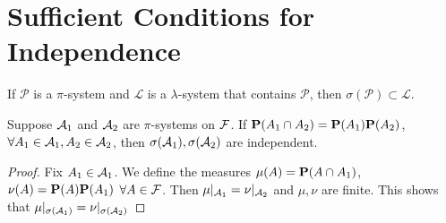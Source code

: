 \section{Sufficient Conditions for Independence}
\begin{theorem}
If $\mathcal{P}$ is a $\pi$-system and $\mathcal{L}$ is a $\lambda$-system that contains $\mathcal{P}$, then $\sigma(\mathcal{P})\subset \mathcal{L}$.
\end{theorem}

\begin{theorem}
    Suppose $\mathcal{A}_1$ and $\mathcal{A}_2$ are $\pi$-systems on $\mathcal{F}$. If $\mathbf{P}(A_1\cap A_2)=\mathbf{P}(A_1)\mathbf{P}(A_2)$, $\forall A_1\in\mathcal{A}_1,A_2\in\mathcal{A}_2$,
    then $\sigma(\mathcal{A}_1),\sigma(\mathcal{A}_2)$ are independent.
\end{theorem}
\begin{proof}
    Fix $A_1\in\mathcal{A}_1$. We define the measures $\mu(A)=\mathbf{P}(A\cap A_1)$, $\nu(A)=\mathbf{P}(A)\mathbf{P}(A_1)$ $\forall A\in\mathcal{F}$. 
    Then $\mu |_{\mathcal{A}_1}=\nu |_{\mathcal{A}_2}$ and $\mu,\nu$ are finite. This shows that $\mu |_{\sigma(\mathcal{A}_1)}=\nu |_{\sigma(\mathcal{A}_2)}$
\end{proof}




